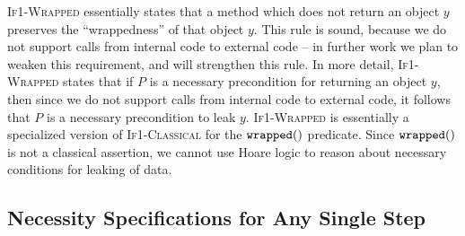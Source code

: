  
\textsc{If1-Wrapped} essentially states that a method which does not return an object $y$ 
preserves the ``wrappedness'' of that object $y$. 
This rule is sound, 
because we do not support calls from internal code to external code
-- in further work we plan to weaken this requirement, and will  
strengthen this rule.
In more detail,  \textsc{If1-Wrapped}   states that if $P$ is
a necessary precondition for returning an object $y$, then  
since we do not support calls from internal code to external code,
it follows that $P$ is a necessary precondition to leak $y$.
\textsc{If1-Wrapped}  is essentially  a specialized version of \textsc{If1-Classical}
for the $\texttt{wrapped}(  )$ predicate. Since $\texttt{wrapped}(  )$ is not a classical
assertion, we cannot use Hoare logic to reason about necessary conditions
for leaking of data.
 
 
 

\subsection{Necessity Specifications for Any Single Step}
\label{s:module-proof}

